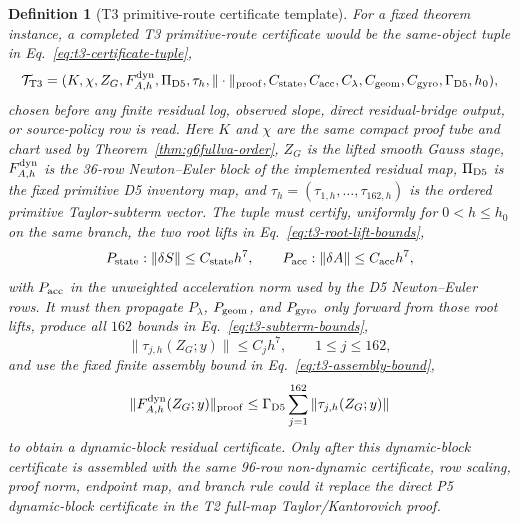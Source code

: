 \documentclass[preprint,12pt]{elsarticle}
\newtheorem{definition}{Definition}
\begin{document}
\begin{definition}[T3 primitive-route certificate template]
\label{def:t3-primitive-route-certificate-template}
For a fixed theorem instance, a completed T3 primitive-route certificate would
be the same-object tuple in Eq.~\eqref{eq:t3-certificate-tuple},
\begin{equation}
\label{eq:t3-certificate-tuple}
  \mathcal T_{\rm T3}
  =(K,\chi,Z_G,F^{\rm dyn}_{A,h},\Pi_{\rm D5},\tau_h,
    \|\cdot\|_{\rm proof},C_{\rm state},C_{\rm acc},C_{\lambda},
    C_{\rm geom},C_{\rm gyro},\Gamma_{\rm D5},h_0),
\end{equation}
chosen before any finite residual log, observed slope, direct residual-bridge
output, or source-policy row is read.  Here \(K\) and \(\chi\) are the same
compact proof tube and chart used by Theorem~\ref{thm:g6fullva-order},
\(Z_G\) is the lifted smooth Gauss stage, \(F^{\rm dyn}_{A,h}\) is the
36-row Newton--Euler block of the implemented residual map, \(\Pi_{\rm D5}\)
is the fixed primitive D5 inventory map, and
\(\tau_h=(\tau_{1,h},\ldots,\tau_{162,h})\) is the ordered primitive
Taylor-subterm vector.  The tuple must certify, uniformly for
\(0<h\le h_0\) on the same branch, the two root lifts in
Eq.~\eqref{eq:t3-root-lift-bounds},
\begin{equation}
\label{eq:t3-root-lift-bounds}
  P_{\rm state}:\|\delta S\|\le C_{\rm state}h^7,\qquad
  P_{\rm acc}:\|\delta A\|\le C_{\rm acc}h^7,
\end{equation}
with \(P_{\rm acc}\) in the unweighted acceleration norm used by the D5
Newton--Euler rows.  It must then propagate \(P_{\lambda}\),
\(P_{\rm geom}\), and \(P_{\rm gyro}\) only forward from those root lifts,
produce all \(162\) bounds in Eq.~\eqref{eq:t3-subterm-bounds},
\begin{equation}
\label{eq:t3-subterm-bounds}
  \|\tau_{j,h}(Z_G;y)\|\le C_jh^7,\qquad 1\le j\le 162,
\end{equation}
and use the fixed finite assembly bound in Eq.~\eqref{eq:t3-assembly-bound},
\begin{equation}
\label{eq:t3-assembly-bound}
  \|F^{\rm dyn}_{A,h}(Z_G;y)\|_{\rm proof}
  \le \Gamma_{\rm D5}\sum_{j=1}^{162}\|\tau_{j,h}(Z_G;y)\|
\end{equation}
to obtain a dynamic-block residual certificate.  Only after this dynamic-block
certificate is assembled with the same 96-row non-dynamic certificate, row
scaling, proof norm, endpoint map, and branch rule could it replace the direct
P5 dynamic-block certificate in the T2 full-map Taylor/Kantorovich proof.

\end{definition}
\end{document}
